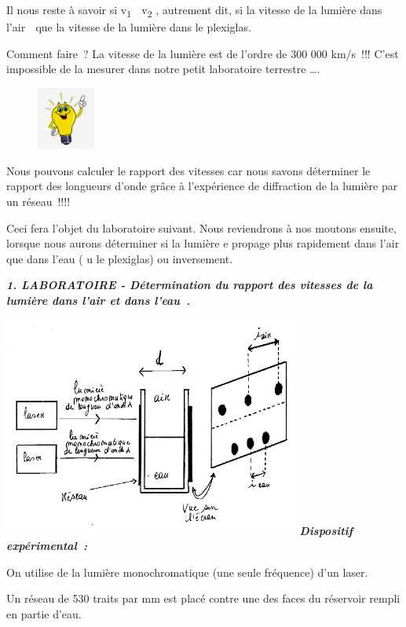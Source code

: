 Il nous reste à savoir si v\textsubscript{1 } v\textsubscript{2} ,
autrement dit, si la vitesse de la lumière dans l'air  que la vitesse
de la lumière dans le plexiglas.

Comment faire~? La vitesse de la lumière est de l'ordre de 300 000
km/s~!!! C'est impossible de la mesurer dans notre petit laboratoire
terrestre \ldots.

\begin{figure}
\centering
\includegraphics[width=1.898cm,height=2.048cm]{Pictures/1000000100000184000001A368D3CEB0029E7460.png}
\caption{}
\end{figure}

Nous pouvons calculer le rapport des vitesses car nous savons déterminer
le rapport des longueurs d'onde grâce à l'expérience de diffraction de
la lumière par un réseau~!!!!

Ceci fera l'objet du laboratoire suivant. Nous reviendrons à nos moutons
ensuite, lorsque nous aurons déterminer si la lumière e propage plus
rapidement dans l'air que dans l'eau ( u le plexiglas) ou inversement.

\emph{\textbf{1. LABORATOIRE - Détermination du rapport des vitesses de
la lumière dans l'air et dans l'eau~.}}

\includegraphics[width=9.885cm,height=7.243cm]{Pictures/1000000100000257000001B74156330002E2CF55.png}\emph{\textbf{Dispositif
expérimental~: }}

On utilise de la lumière monochromatique (une seule fréquence) d'un
laser.

Un réseau de 530 traits par mm est placé contre une des faces du
réservoir rempli en partie d'eau.


